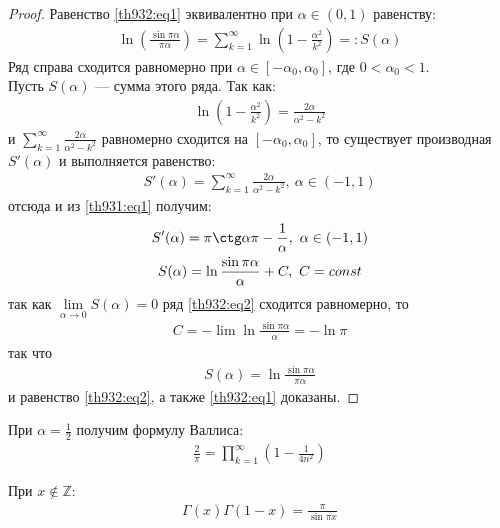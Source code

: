 \begin{proof}
  Равенство \eqref{th932:eq1} эквивалентно при $\alpha \in (0, 1)$ равенству:
  \begin{gather}
    \ln \left(\frac{\sin \pi \alpha}{\pi \alpha}\right) = \sum\limits_{k =
    1}^{\infty} \ln \left(1 - \frac{\alpha^2}{k^2} \right) =: S(\alpha)
    \label{th932:eq2}
  \end{gather}
  Ряд справа сходится равномерно при $\alpha \in [-\alpha_0, \alpha_0]$, где $0
  < \alpha_0 < 1$. \\
  Пусть $S(\alpha)$ --- сумма этого ряда. Так как:
  \begin{gather*}
    \ln \left(1 - \frac{\alpha^2}{k^2}\right) = \frac{2\alpha}{\alpha^2 - k^2}
  \end{gather*}
  и $\sum\limits_{k = 1}^{\infty} \frac{2\alpha}{\alpha^2 - k^2}$
  равномерно сходится на $[-\alpha_0, \alpha_0]$, то существует производная
  $S'(\alpha)$ и выполняется равенство:
  \begin{gather*}
    S'(\alpha) = \sum\limits_{k = 1}^{\infty} \frac{2\alpha}{\alpha^2 - k^2}, \
    \alpha \in (-1, 1)
  \end{gather*}
  отсюда и из \eqref{th931:eq1} получим:
  \begin{gather*}
    S'(\alpha) = \pi \ctg \alpha \pi - \frac{1}{\alpha}, \ \alpha \in (-1, 1) \\
    S(\alpha) = \ln \frac{\sin \pi \alpha}{\alpha} + C, \ C = const
  \end{gather*}
  так как $\lim\limits_{\alpha \to 0} S(\alpha) = 0$ ряд \eqref{th932:eq2}
  сходится равномерно, то
  \begin{gather*}
    C = - \lim \ln \frac{\sin \pi \alpha}{\alpha} = - \ln \pi
  \end{gather*}
  так что
  \begin{gather*}
    S(\alpha) = \ln \frac{\sin \pi \alpha}{\pi \alpha}
  \end{gather*}
  и равенство \eqref{th932:eq2}, а также \eqref{th932:eq1} доказаны.
\end{proof}

\begin{consequence}
  При $\alpha = \frac{1}{2}$ получим формулу Валлиса:
  \begin{gather}
    \frac{2}{\pi} = \prod\limits_{k = 1}^\infty \left(1 - \frac{1}{4n^2}\right)
    \label{th932:eq3}
  \end{gather}
\end{consequence}

\begin{theorem}
  При $x \not \in \mathbb{Z}$:
  \begin{gather}
    \Gamma(x) \Gamma(1 - x) = \frac{\pi}{\sin \pi x}
    \label{th933:eq1}
  \end{gather}
\end{theorem}

